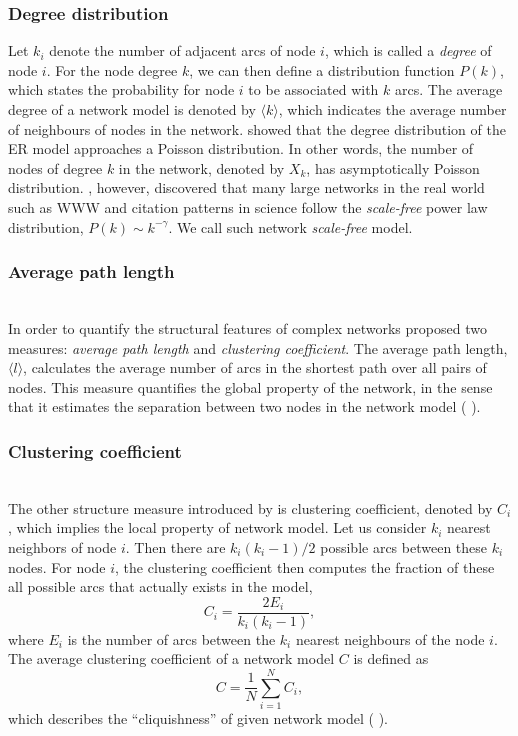 \subsubsection{Degree distribution}
Let $k_i$ denote the number of adjacent arcs of node $i$, which is called a \textit{degree} of node $i$. For the node degree $k$, we can then define a distribution function $P(k)$, which states the probability for node $i$ to be associated with $k$ arcs. The average degree of a network model is denoted by $\langle k \rangle$, which indicates the average number of neighbours of nodes in the network. \citeauthor{bollobas2001random} \cite{bollobas2001random} showed that the degree distribution of the ER model approaches a Poisson distribution. In other words, the number of nodes of degree $k$ in the network, denoted by $X_k$, has asymptotically Poisson distribution. \citeauthor{barabasi1999emergence} \cite{barabasi1999emergence}, however, discovered that many large networks in the real world such as WWW and citation patterns in science follow the \textit{scale-free} power law distribution, $P(k) \sim k^{-\gamma}$. We call such network \textit{scale-free} model.

\subsubsection{Average path length}\\
In order to quantify the structural features of complex networks \citeauthor{watts1998} \cite{watts1998} proposed two measures: \textit{average path length} and \textit{clustering coefficient}. The average path length, $\langle l \rangle$, calculates the average number of arcs in the shortest path over all pairs of nodes. This measure quantifies the global property of the network, in the sense that it estimates the separation between two nodes in the network model (\citeauthor{watts1998} \cite{watts1998}).

\subsubsection{Clustering coefficient}\\
The other structure measure introduced by \citeauthor{watts1998} \cite{watts1998} is clustering coefficient, denoted by $C_i$, which implies the local property of network model. Let us consider $k_i$ nearest neighbors of node $i$. Then there are $k_i(k_i-1)/2$ possible arcs between these $k_i$ nodes. For node $i$, the clustering coefficient then computes the fraction of these all possible arcs that actually exists in the model,
$$C_i = \frac{2E_i}{k_i(k_i-1)},$$
where $E_i$ is the number of arcs between the $k_i$ nearest neighbours of the node $i$. The average clustering coefficient of a network model $C$ is defined as
$$C = \frac{1}{N}\sum_{i=1}^{N}C_i,$$
which describes the ``cliquishness'' of given network model (\citeauthor{watts1998} \cite{watts1998}).

